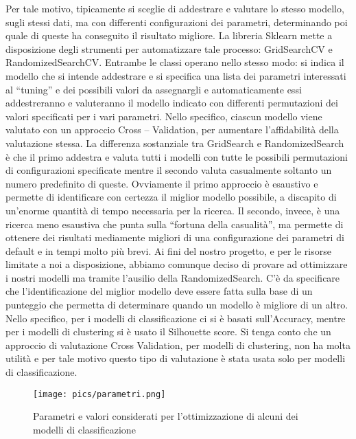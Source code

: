\documentclass[12pt,oneside]{article}
\begin{document}
        \begin{justify}
        Per tale motivo, tipicamente si sceglie di addestrare e valutare lo stesso modello, sugli stessi dati, ma con differenti configurazioni dei parametri, determinando poi quale di queste ha conseguito il risultato migliore. 
        La libreria Sklearn mette a disposizione degli strumenti per automatizzare tale processo: GridSearchCV e RandomizedSearchCV. Entrambe le classi operano nello stesso modo: si indica il modello che si intende addestrare e si specifica una lista dei parametri interessati al “tuning” e dei possibili valori da assegnargli e automaticamente essi addestreranno e valuteranno il modello indicato con differenti permutazioni dei valori specificati per i vari parametri. Nello specifico, ciascun modello viene valutato con un approccio Cross – Validation, per aumentare l’affidabilità della valutazione stessa. La differenza sostanziale tra GridSearch e RandomizedSearch è che il primo addestra e valuta tutti i modelli con tutte le possibili permutazioni di configurazioni specificate mentre il secondo valuta casualmente soltanto un numero predefinito di queste. Ovviamente il primo approccio è esaustivo e permette di identificare con certezza il miglior modello possibile, a discapito di un’enorme quantità di tempo necessaria per la ricerca. Il secondo, invece, è una ricerca meno esaustiva che punta sulla “fortuna della casualità”, ma permette di ottenere dei risultati mediamente migliori di una configurazione dei parametri di default e in tempi molto più brevi.
        Ai fini del nostro progetto, e per le risorse limitate a noi a disposizione, abbiamo comunque deciso di provare ad ottimizzare i nostri modelli ma tramite l’ausilio della RandomizedSearch. C’è da specificare che l’identificazione del miglior modello deve essere fatta sulla base di un punteggio che permetta di determinare quando un modello è migliore di un altro. Nello specifico, per i modelli di classificazione ci si è basati sull’Accuracy, mentre per i modelli di clustering si è usato il Silhouette score. Si tenga conto che un approccio di valutazione Cross Validation, per modelli di clustering, non ha molta utilità e per tale motivo questo tipo di valutazione è stata usata solo per modelli di classificazione.
        \end{justify}

        \begin{figure}[H]
        \texttt{[image: pics/parametri.png]}
        \captionsetup{width=0.70\textwidth, justification=centering}
        \caption{Parametri e valori considerati per l’ottimizzazione di alcuni dei modelli di classificazione}
        \end{figure}
\end{document}
